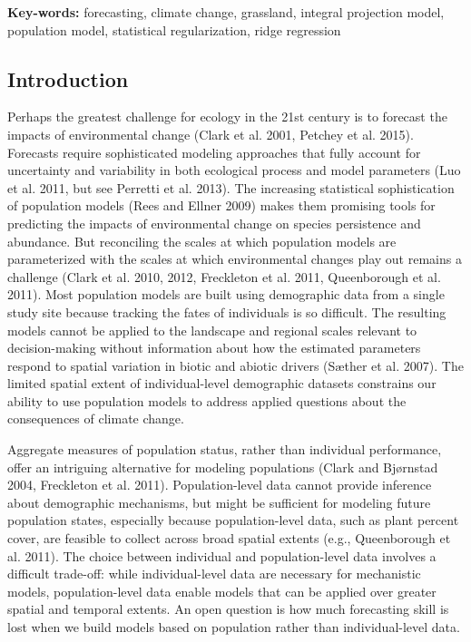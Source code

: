 \documentclass[12pt,]{article}
\begin{document}
\textsf{\textbf{Key-words:}} forecasting, climate change, grassland,
integral projection model, population model, statistical regularization,
ridge regression

\subsection{Introduction}\label{introduction}

Perhaps the greatest challenge for ecology in the 21st century is to
forecast the impacts of environmental change (Clark et al. 2001, Petchey
et al. 2015). Forecasts require sophisticated modeling approaches that
fully account for uncertainty and variability in both ecological process
and model parameters (Luo et al. 2011, but see Perretti et al. 2013).
The increasing statistical sophistication of population models (Rees and
Ellner 2009) makes them promising tools for predicting the impacts of
environmental change on species persistence and abundance. But
reconciling the scales at which population models are parameterized with
the scales at which environmental changes play out remains a challenge
(Clark et al. 2010, 2012, Freckleton et al. 2011, Queenborough et al.
2011). Most population models are built using demographic data from a
single study site because tracking the fates of individuals is so
difficult. The resulting models cannot be applied to the landscape and
regional scales relevant to decision-making without information about
how the estimated parameters respond to spatial variation in biotic and
abiotic drivers (S{æ}ther et al. 2007). The limited spatial extent of
individual-level demographic datasets constrains our ability to use
population models to address applied questions about the consequences of
climate change.

Aggregate measures of population status, rather than individual
performance, offer an intriguing alternative for modeling populations
(Clark and Bj{ø}rnstad 2004, Freckleton et al. 2011). Population-level
data cannot provide inference about demographic mechanisms, but might be
sufficient for modeling future population states, especially because
population-level data, such as plant percent cover, are feasible to
collect across broad spatial extents (e.g., Queenborough et al. 2011).
The choice between individual and population-level data involves a
difficult trade-off: while individual-level data are necessary for
mechanistic models, population-level data enable models that can be
applied over greater spatial and temporal extents. An open question is
how much forecasting skill is lost when we build models based on
population rather than individual-level data.
\end{document}
